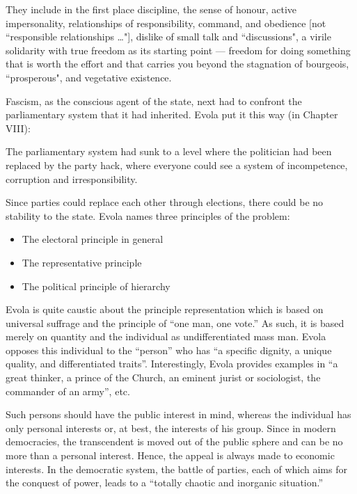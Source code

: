 \begin{quotex}
They include in the first place discipline, the sense of honour, active impersonality, relationships of responsibility, command, and obedience [not ``responsible relationships …"], dislike of small talk and ``discussions", a virile solidarity with true freedom as its starting point — freedom for doing something that is worth the effort and that carries you beyond the stagnation of bourgeois, ``prosperous", and vegetative existence. 

\end{quotex}

Fascism, as the conscious agent of the state, next had to confront the parliamentary system that it had inherited. Evola put it this way (in Chapter VIII):

\begin{quotex}
The parliamentary system had sunk to a level where the politician had been replaced by the party hack, where everyone could see a system of incompetence, corruption and irresponsibility. 
\end{quotex}

Since parties could replace each other through elections, there could be no stability to the state. Evola names three principles of the problem:

\begin{itemize}
\item The electoral principle in general
\item The representative principle
\item The political principle of hierarchy
\end{itemize}

Evola is quite caustic about the principle representation which is based on universal suffrage and the principle of “one man, one vote.” As such, it is based merely on quantity and the individual as undifferentiated mass man. Evola opposes this individual to the “person” who has “a specific dignity, a unique quality, and differentiated traits”. Interestingly, Evola provides examples in “a great thinker, a prince of the Church, an eminent jurist or sociologist, the commander of an army”, etc.

Such persons should have the public interest in mind, whereas the individual has only personal interests or, at best, the interests of his group. Since in modern democracies, the transcendent is moved out of the public sphere and can be no more than a personal interest. Hence, the appeal is always made to economic interests. In the democratic system, the battle of parties, each of which aims for the conquest of power, leads to a “totally chaotic and inorganic situation.”


